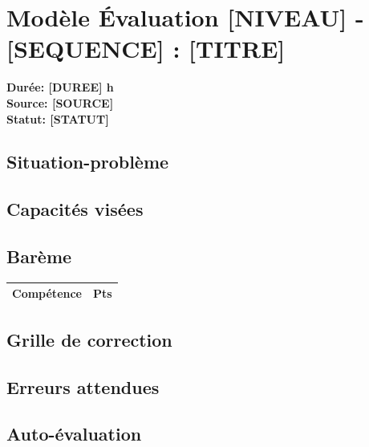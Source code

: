 \documentclass[a4paper,11pt]{article}
\begin{document}
\section*{Modèle Évaluation [NIVEAU] - [SEQUENCE] : [TITRE]}
\textbf{Durée: [DUREE] h}\\
\textbf{Source: [SOURCE]}\\
\textbf{Statut: [STATUT]}

\subsection*{Situation-problème}

\subsection*{Capacités visées}

\subsection*{Barème}

\begin{tabular}{|l|c|}
\hline
\textbf{Compétence} & \textbf{Pts} \\
\hline
\hline
\end{tabular}

\subsection*{Grille de correction}

\subsection*{Erreurs attendues}

\subsection*{Auto-évaluation}
\end{document}
